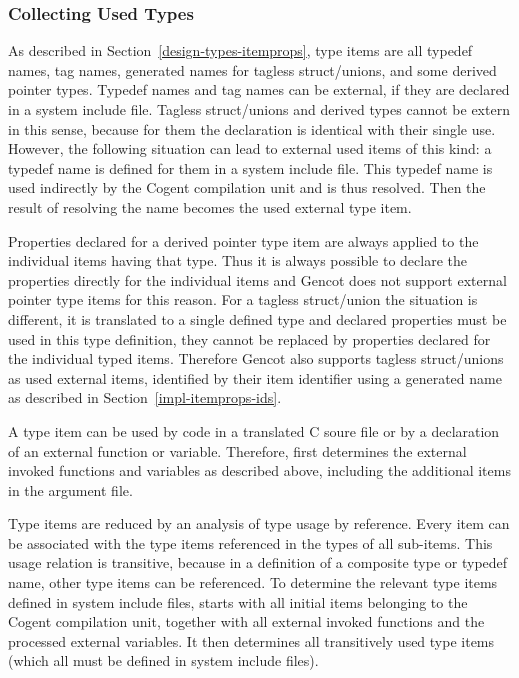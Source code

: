 \subsubsection{Collecting Used Types}

As described in Section~\ref{design-types-itemprops}, type items are all typedef names, tag names, generated names 
for tagless struct/unions, and some derived pointer types. Typedef names and tag names can be external, if they are 
declared in a system include file. Tagless struct/unions and derived types cannot be extern in this sense, because 
for them the declaration is identical with their single use. However, the following situation can lead to external 
used items of this kind: a typedef name is defined for them in a system include file. This typedef name is used 
indirectly by the Cogent compilation unit and is thus resolved. Then the result of resolving the name becomes the 
used external type item. 

Properties declared for a derived pointer type item are always applied to the individual items having that type. 
Thus it is always possible to declare the properties directly for the individual items and Gencot does not support 
external pointer type items for this reason. For a tagless struct/union the situation is different, it is translated
to a single defined type and declared properties must be used in this type definition, they cannot be replaced by
properties declared for the individual typed items. Therefore Gencot also supports tagless struct/unions as used
external items, identified by their item identifier using a generated name as described in Section~\ref{impl-itemprops-ids}.

A type item can be used by code in a translated C soure file or by a declaration of an external function or variable.
Therefore,  first determines the external invoked functions and variables as described above, including
the additional items in the argument file.

Type items are reduced by an analysis of type usage by reference. Every item can be
associated with the type items referenced in the types of all sub-items. This usage relation is transitive, because 
in a definition of a composite type or typedef name, other type items can be referenced. To determine the relevant 
type items defined in system include files,  starts with all initial items belonging
to the Cogent compilation unit, together with all external invoked functions and the processed external variables. 
It then determines all transitively used type items (which all must be defined in system include files).

